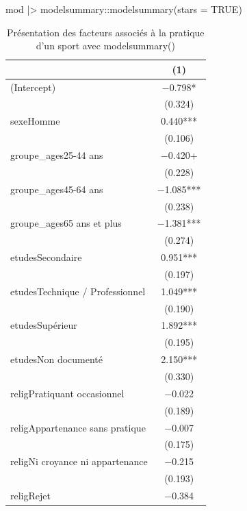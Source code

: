 \documentclass[
  letterpaper,
  DIV=11,
  numbers=noendperiod,
  oneside]{scrreprt}
\newenvironment{Shaded}{\begin{snugshade}}{\end{snugshade}}
\newcommand{\AttributeTok}[1]{\textcolor[rgb]{0.40,0.45,0.13}{#1}}
\newcommand{\ConstantTok}[1]{\textcolor[rgb]{0.56,0.35,0.01}{#1}}
\newcommand{\FunctionTok}[1]{\textcolor[rgb]{0.28,0.35,0.67}{#1}}
\newcommand{\NormalTok}[1]{\textcolor[rgb]{0.00,0.23,0.31}{#1}}
\newcommand{\SpecialCharTok}[1]{\textcolor[rgb]{0.37,0.37,0.37}{#1}}
\begin{document}
\begin{Shaded}
\begin{Highlighting}[]
\NormalTok{mod }\SpecialCharTok{|\textgreater{}}\NormalTok{ modelsummary}\SpecialCharTok{::}\FunctionTok{modelsummary}\NormalTok{(}\AttributeTok{stars =} \ConstantTok{TRUE}\NormalTok{)}
\end{Highlighting}
\end{Shaded}

\hypertarget{tbl-modelsummary}{}
\begin{table}
\caption{\label{tbl-modelsummary}Présentation des facteurs associés à la pratique d'un sport avec
modelsummary() }\tabularnewline

\centering
\begin{tabular}[t]{lc}
\toprule
  & (1)\\
\midrule
(Intercept) & \num{-0.798}*\\
 & (\num{0.324})\\
sexeHomme & \num{0.440}***\\
 & (\num{0.106})\\
groupe\_ages25-44 ans & \num{-0.420}+\\
 & (\num{0.228})\\
groupe\_ages45-64 ans & \num{-1.085}***\\
 & (\num{0.238})\\
groupe\_ages65 ans et plus & \num{-1.381}***\\
 & (\num{0.274})\\
etudesSecondaire & \num{0.951}***\\
 & (\num{0.197})\\
etudesTechnique / Professionnel & \num{1.049}***\\
 & (\num{0.190})\\
etudesSupérieur & \num{1.892}***\\
 & (\num{0.195})\\
etudesNon documenté & \num{2.150}***\\
 & (\num{0.330})\\
religPratiquant occasionnel & \num{-0.022}\\
 & (\num{0.189})\\
religAppartenance sans pratique & \num{-0.007}\\
 & (\num{0.175})\\
religNi croyance ni appartenance & \num{-0.215}\\
 & (\num{0.193})\\
religRejet & \num{-0.384}\\

\end{tabular}
\end{table}
\end{document}
